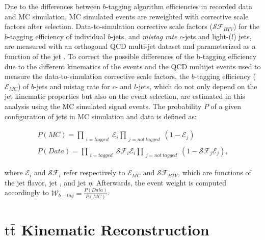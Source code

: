 Due to the differences between $b$-tagging algorithm efficiencies in recorded data and MC simulation, MC simulated events are reweighted with corrective scale factors after selection.
Data-to-simulation corrective scale factors ($\mathcal{SF}_{BTV}$) for the $b$-tagging efficiency of individual $b$-jets, and \textit{mistag rate} $c$-jets and light-($l$) jets, are measured with an orthogonal QCD multi-jet dataset and parameterized as a function of the jet \pT.
To correct the possible differences of the b-tagging efficiency due to the different kinematics of the \ttbar events and the QCD multijet events used to measure the data-to-simulation corrective scale factors, the $b$-tagging efficiency ($\mathcal{E}_{MC}$) of $b$-jets and mistag rate for $c$- and $l$-jets, which do not only depend on the jet kinematic properties but also on the event selection, are estimated in this analysis using the MC simulated \ttbar signal events.
The probability $P$ of a given configuration of jets in MC simulation and data is defined as:
\begin{linenomath*}
\begin{align}
P(MC) = \prod_{\substack{i=tagged}} \mathcal{E}_i \prod_{\substack{j=not~tagged}} (1 - \mathcal{E}_j) \\
P(Data) = \prod_{\substack{i=tagged}} \mathcal{SF}_i\mathcal{E}_i \prod_{\substack{j=not~tagged}} (1 - \mathcal{SF}_j\mathcal{E}_j),
\end{align}
\end{linenomath*}
where $\mathcal{E}_i$ and $ \mathcal{SF}_i $ refer respectively to $\mathcal{E}_{MC}$ and $\mathcal{SF}_{BTV}$, which are functions of the jet flavor, jet \pT, and jet $\eta$. 
Afterwards, the event weight is computed accordingly to $\mathcal{W}_{b-tag} = \frac{P(Data)}{P(MC)}$.


\section{\ensuremath{\mathrm{t\bar{t}}} Kinematic Reconstruction}

